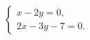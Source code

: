 \begin{ex}
	\begin{condition}
		\( \left\{
		\begin{array}{l}
			x-2y=0,\\
			2x-3y-7=0.
		\end{array}
		\right. \)
	\end{condition}
\end{ex}